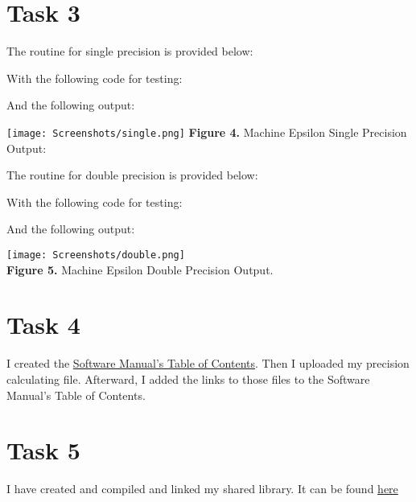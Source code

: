 \documentclass{article}
\begin{document}
\section*{Task 3}
The routine for single precision is provided below:

With the following code for testing:

And the following output:
\begin{center}
\texttt{[image: Screenshots/single.png]}
{\bf Figure 4.} Machine Epsilon Single Precision Output:
\end{center}
The routine for double precision is provided below:

With the following code for testing:

And the following output:
\begin{center}
\texttt{[image: Screenshots/double.png]}\\
{\bf Figure 5.} Machine Epsilon Double Precision Output.
\end{center}

\pagebreak

\section*{Task 4}
I created the \href{https://github.com/GoByMark/math4610/blob/fc8000ef7021a30b30a2c3733014ef5a0f7fed78/Homework_Tasks/Software_Manual/Software_Manual_toc.md}{Software Manual's Table of Contents}. Then I uploaded my precision calculating file. Afterward, I added the links to those files to the Software Manual's Table of Contents.

\vspace{5pt}

\section*{Task 5}
I have created and compiled and linked my shared library. It can be found \href{https://github.com/GoByMark/math4610/blob/d0507f36da5cdfa2d51124cb446eefca3e7cf3a4/Homework_Tasks/Tasksheet_03/src/mylib.a}{here}\

\vspace{5pt}
\end{document}
